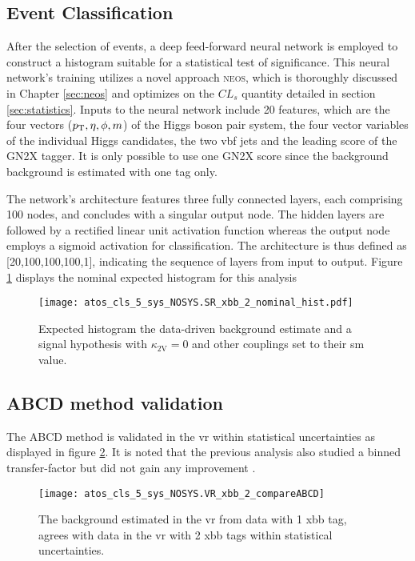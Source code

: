 \subsection{Event Classification}
After the selection of events, a deep feed-forward neural network is employed to construct a histogram suitable for a statistical test of significance. This neural network's training utilizes a novel approach \textsc{neos}, which is thoroughly discussed in Chapter \ref{sec:neos} and optimizes on the $CL_s$ quantity detailed in section \ref{sec:statistics}. Inputs to the neural network include 20 features, which are the four vectors ($p_{\text{T}},\eta,\phi,m$) of the Higgs boson pair system, the four vector variables of the individual Higgs candidates, the two \ac{vbf} jets and the leading score of the GN2X tagger. It is only possible to use one GN2X score since the background background is estimated with one tag only.

The network's architecture features three fully connected layers, each comprising 100 nodes, and concludes with a singular output node. The hidden layers are followed by a rectified linear unit activation function whereas the output node employs a sigmoid activation for classification. The architecture is thus defined as [20,100,100,100,1], indicating the sequence of layers from input to output. Figure \ref{fig:nominal-hist} displays the nominal expected histogram for this analysis

\begin{figure}
    \centering
    \texttt{[image: atos\_cls\_5\_sys\_NOSYS.SR\_xbb\_2\_nominal\_hist.pdf]}
    \caption[]{Expected histogram the data-driven background estimate and a signal hypothesis with $\kappa_\text{2V}=0$ and other couplings set to their \ac{sm} value. }
    \label{fig:nominal-hist}
\end{figure}

\subsection{ABCD method validation}
The ABCD method is validated in the \ac{vr} within statistical uncertainties as displayed in figure \ref{fig:bkg-validation}. It is noted that the previous analysis also studied a binned transfer-factor but did not gain any improvement \citep{ATL-COM-PHYS-2023-033}.
\begin{figure}
    \centering
    \texttt{[image: atos\_cls\_5\_sys\_NOSYS.VR\_xbb\_2\_compareABCD]}
    \caption[]{The background estimated in the \ac{vr} from data with 1 xbb tag, agrees with data in the \ac{vr} with 2 xbb tags within statistical uncertainties.}
    \label{fig:bkg-validation}
\end{figure}


